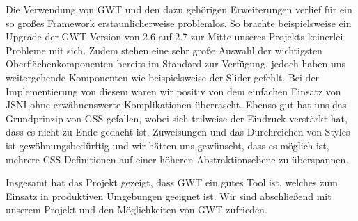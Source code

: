 Die Verwendung von GWT und den dazu gehörigen Erweiterungen verlief für ein so großes Framework erstaunlicherweise problemlos.
So brachte beispielsweise ein Upgrade der GWT-Version von 2.6 auf 2.7 zur Mitte unseres Projekts keinerlei Probleme mit sich. Zudem stehen eine sehr große Auswahl der wichtigsten Oberflächenkomponenten bereits im Standard zur Verfügung, jedoch haben uns weitergehende Komponenten wie beispielsweise der Slider gefehlt. Bei der Implementierung von diesem waren wir positiv von dem einfachen Einsatz von JSNI ohne erwähnenswerte Komplikationen überrascht. Ebenso gut hat uns das Grundprinzip von GSS gefallen, wobei sich teilweise der Eindruck verstärkt hat, dass es nicht zu Ende gedacht ist. Zuweisungen und das Durchreichen von Styles ist gewöhnungsbedürftig und wir hätten uns gewünscht, dass es möglich ist, mehrere CSS-Definitionen auf einer höheren Abstraktionsebene zu überspannen.

Insgesamt hat das Projekt gezeigt, dass GWT ein gutes Tool ist, welches zum Einsatz in produktiven Umgebungen geeignet ist. Wir sind abschließend mit unserem Projekt und den Möglichkeiten von GWT zufrieden.

